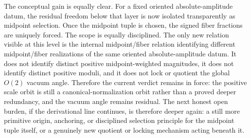 \documentclass[11pt]{article}
\begin{document}
The conceptual gain is equally clear. For a fixed oriented absolute-amplitude datum, the residual freedom below that layer is now isolated transparently as midpoint selection. Once the midpoint tuple is chosen, the signed fiber fractions are uniquely forced. The scope is equally disciplined. The only new relation visible at this level is the internal midpoint/fiber relation identifying different midpoint/fiber realizations of the same oriented absolute-amplitude datum. It does not identify distinct positive midpoint-weighted magnitudes, it does not identify distinct positive moduli, and it does not lock or quotient the global \(O(2)\) vacuum angle. Therefore the current verdict remains in force: the positive scale orbit is still a canonical-normalization orbit rather than a proved deeper redundancy, and the vacuum angle remains residual. The next honest open burden, if the derivational line continues, is therefore deeper again: a still more primitive origin, anchoring, or disciplined selection principle for the midpoint tuple itself, or a genuinely new quotient or locking mechanism acting beneath it.
\end{document}
